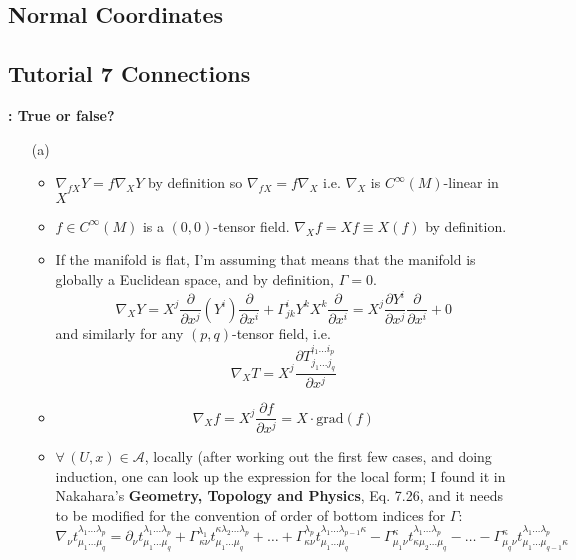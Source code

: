 \documentclass[10pt, twoside]{amsart}
\newcommand{\exercisehead}[1]
  { \smallskip
   \noindent{\small\bf Exercise #1.}
  }
\begin{document}
\begin{multicols*}{2}
\subsection{Normal Coordinates}

\subsection*{Tutorial 7 Connections}

\exercisehead{1}\textbf{: True or false?}

\begin{enumerate}
\item[(a)] 
\begin{itemize}
\item $\nabla_{fX}Y = f\nabla_XY$ by definition so $\nabla_{fX} = f\nabla_X$ i.e. $\nabla_X$ is $C^{\infty}(M)$-linear in $X$
\item $f\in C^{\infty}(M)$ is a $(0,0)$-tensor field. $\nabla_Xf = Xf \equiv X(f)$ by definition.
\item If the manifold is flat, I'm assuming that means that the manifold is globally a Euclidean space, and by definition, $\Gamma=0$.
\[
\nabla_X Y = X^j \frac{ \partial }{ \partial x^j} (Y^i) \frac{ \partial }{ \partial x^i } + \Gamma^i_{jk} Y^k X^k \frac{ \partial }{ \partial x^i} = X^j \frac{ \partial Y^i}{ \partial x^j} \frac{ \partial }{ \partial x^i} + 0
\]
and similarly for any $(p,q)$-tensor field, i.e.
\[
\nabla_X T = X^j \frac{ \partial T^{i_1 \dots i_p}_{ j_1 \dots j_q} }{ \partial x^j}
\]
\item \[
\nabla_X f = X^j \frac{ \partial f}{ \partial x^j} = X\cdot \text{grad}(f)
\]
\item $\forall \, (U,x) \in \mathcal{A}$, locally (after working out the first few cases, and doing induction, one can look up the expression for the local form; I found it in Nakahara's \textbf{Geometry, Topology and Physics}, Eq. 7.26, and it needs to be modified for the convention of order of bottom indices for $\Gamma$:
\[
\nabla_{\nu} t^{\lambda_1 \dots \lambda_p }_{ \mu_1 \dots \mu_q} = \partial_{\nu} t^{\lambda_1 \dots \lambda_p}_{ \mu_1 \dots \mu_q} + \Gamma^{\lambda_1}_{ \,  \kappa \nu } t^{\kappa \lambda_2 \dots \lambda_p }_{\mu_1 \dots \mu_q} + \dots + \Gamma^{\lambda_p}_{ \kappa \nu } t^{\lambda_1 \dots \lambda_{p-1} \kappa }_{ \mu_1 \dots \mu_q} - \Gamma^{\kappa}_{  \mu_1 \nu} t^{\lambda_1 \dots \lambda_p }_{ \kappa \mu_2 \dots \mu_q} - \dots - \Gamma^{\kappa}_{  \mu_q \nu} t^{\lambda_1 \dots \lambda_p }_{\mu_1 \dots \mu_{q-1} \kappa }
\]

\end{itemize}
\end{enumerate}
\end{multicols*}
\end{document}
